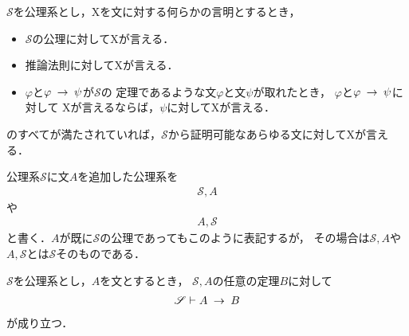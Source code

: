 	\begin{screen}
		\begin{metaaxm}[証明に対する構造的帰納法]
			$\mathscr{S}$を公理系とし，Xを文に対する何らかの言明とするとき，
			\begin{itemize}
				\item $\mathscr{S}$の公理に対してXが言える．
				\item 推論法則に対してXが言える．
				\item $\varphi$と$\varphi \hspace{0.25em}\rightarrow\hspace{0.25em} \psi$が$\mathscr{S}$の
					定理であるような文$\varphi$と文$\psi$が取れたとき，
					$\varphi$と$\varphi \hspace{0.25em}\rightarrow\hspace{0.25em} \psi$に対して
					Xが言えるならば，$\psi$に対してXが言える．
			\end{itemize}
			のすべてが満たされていれば，$\mathscr{S}$から証明可能なあらゆる文に対してXが言える．
		\end{metaaxm}
	\end{screen}
	
	公理系$\mathscr{S}$に文$A$を追加した公理系を
	\begin{align}
		\mathscr{S}, A
	\end{align}
	や
	\begin{align}
		A, \mathscr{S}
	\end{align}
	と書く．$A$が既に$\mathscr{S}$の公理であってもこのように表記するが，
	その場合は$\mathscr{S}, A$や$A,\mathscr{S}$とは$\mathscr{S}$そのものである．
	
	\begin{screen}
		\begin{metathm}[演繹法則]\label{metathm:deduction_theorem}
			$\mathscr{S}$を公理系とし，$A$を文とするとき，
			$\mathscr{S}, A$の任意の定理$B$に対して
			\begin{align}
				\mathscr{S} \vdash A \hspace{0.25em}\rightarrow\hspace{0.25em} B
			\end{align}
			が成り立つ．
		\end{metathm}
	\end{screen}
	
